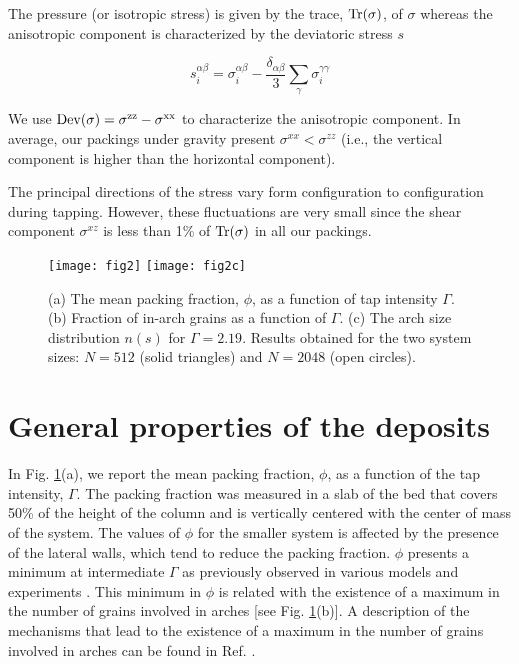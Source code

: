 The pressure (or isotropic stress) is given by the trace, $\rm{Tr}(\sigma)$, of $\sigma$ whereas the anisotropic component is characterized by the deviatoric stress $s$

\begin{equation}
 s_i^{\alpha\beta}=\sigma_i^{\alpha\beta}-\frac{\delta_{\alpha\beta}}{3}\sum_{\gamma}{\sigma_i^{\gamma\gamma}} \label{eq2}
\end{equation}

We use $\rm{Dev}(\sigma)=\sigma^{zz}-\sigma^{xx}$ to characterize the anisotropic component. In average, our packings under gravity present $\sigma^{xx} < \sigma^{zz}$ (i.e., the vertical component is higher than the horizontal component).

The principal directions of the stress vary form configuration to configuration during tapping. However, these fluctuations are very small since the shear component $\sigma^{xz}$ is less than 1\% of $\rm{Tr}(\sigma)$ in all our packings.

\begin{figure}[t]
\centering
\texttt{[image: fig2]}
\texttt{[image: fig2c]}
\caption {(a) The mean packing fraction, $\phi$, as a function of tap intensity $\Gamma$. (b) Fraction of in-arch grains as a function of $\Gamma$. (c) The arch size distribution $n(s)$ for $\Gamma=2.19$. Results obtained for the two system sizes: $N=512$ (solid triangles) and $N=2048$ (open circles). }
\label{fig2}
\end{figure}

\section{General properties of the deposits}

In Fig. \ref{fig2}(a), we report the mean packing fraction, $\phi$, as a function of the tap intensity, $\Gamma$. The packing fraction was measured in a slab of the bed that covers 50\% of the height of the column and is vertically centered with the center of mass of the system. The values of $\phi$ for the smaller system is affected by the presence of the lateral walls, which tend to reduce the packing fraction. $\phi$ presents a minimum at intermediate $\Gamma$ as previously observed in various models \cite{pugnaloni4,gago} and experiments \cite{pugnaloni1,pugnaloni5}. This minimum in $\phi$ is related with the existence of a maximum in the number of grains involved in arches [see Fig. \ref{fig2}(b)]. A description of the mechanisms that lead to the existence of a maximum in the number of grains involved in arches can be found in Ref. \cite{pugnaloni4}. 

